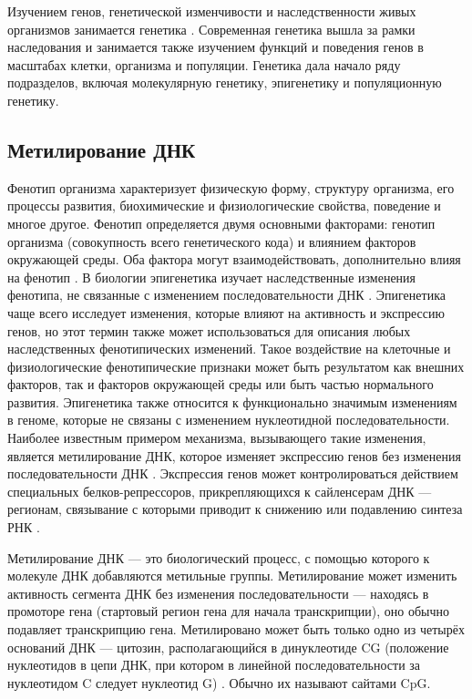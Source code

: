 Изучением генов, генетической изменчивости и наследственности живых организмов занимается генетика \autocite{griffiths2000introduction}. Современная генетика вышла за рамки наследования и занимается также изучением функций и поведения генов в масштабах клетки, организма и популяции. Генетика дала начало ряду подразделов, включая молекулярную генетику, эпигенетику и популяционную генетику.

\subsection{Метилирование ДНК}\label{subsec:ch1/sec1/subsec2}

Фенотип организма характеризует физическую форму, структуру организма, его процессы развития, биохимические и физиологические свойства, поведение и многое другое. Фенотип определяется двумя основными факторами: генотип организма (совокупность всего генетического кода) и влиянием факторов окружающей среды. Оба фактора могут взаимодействовать, дополнительно влияя на фенотип \autocite{Dawkins2010}. В биологии эпигенетика изучает наследственные изменения фенотипа, не связанные с изменением последовательности ДНК \autocite{Dupont2009}. Эпигенетика чаще всего исследует изменения, которые влияют на активность и экспрессию генов, но этот термин также может использоваться для описания любых наследственных фенотипических изменений. Такое воздействие на клеточные и физиологические фенотипические признаки может быть результатом как внешних факторов, так и факторов окружающей среды или быть частью нормального развития. Эпигенетика также относится к функционально значимым изменениям в геноме, которые не связаны с изменением нуклеотидной последовательности. Наиболее известным примером механизма, вызывающего такие изменения, является метилирование ДНК, которое изменяет экспрессию генов без изменения последовательности ДНК \autocite{Bird2007}. Экспрессия генов может контролироваться действием специальных белков-репрессоров, прикрепляющихся к сайленсерам ДНК --- регионам, связывание с которыми приводит к снижению или подавлению синтеза РНК \autocite{Pang2020}.

Метилирование ДНК --- это биологический процесс, с помощью которого к молекуле ДНК добавляются метильные группы. Метилирование может изменить активность сегмента ДНК без изменения последовательности --- находясь в промоторе гена (стартовый регион гена для начала транскрипции), оно обычно подавляет транскрипцию гена. Метилировано может быть только одно из четырёх оснований ДНК --- цитозин, располагающийся в динуклеотиде CG (положение нуклеотидов в цепи ДНК, при котором в линейной последовательности за нуклеотидом C следует нуклеотид G) \autocite{BuckKoehntop2013, Kelsey2013}. Обычно их называют сайтами CpG.

